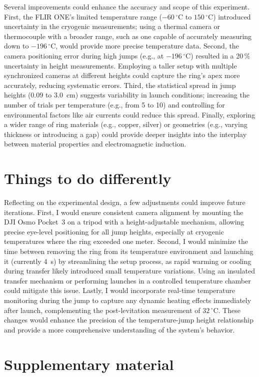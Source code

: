 \documentclass[11pt]{article}
\newcommand{\tC}[1]{$#1\,^{\circ}\mathrm{C}$}
\begin{document}
Several improvements could enhance the accuracy and scope of this experiment. First, the FLIR ONE's
limited temperature range (\tC{-60} to \tC{150}) introduced uncertainty in the cryogenic
measurements; using a thermal camera or thermocouple with a broader range, such as one capable of
accurately measuring down to \tC{-196}, would provide more precise temperature data. Second, the
camera positioning error during high jumps (e.g., at \tC{-196}) resulted in a 20\,\% uncertainty in
height measurements. Employing a taller setup with multiple synchronized cameras at
different heights could capture the ring's apex more accurately, reducing systematic errors. Third,
the statistical spread in jump heights (0.09 to 3.0~cm) suggests variability in launch conditions;
increasing the number of trials per temperature (e.g., from 5 to 10) and controlling for
environmental factors like air currents could reduce this spread. Finally, exploring a wider range of ring
materials (e.g., copper, silver) or geometries (e.g., varying thickness or introducing a gap) could
provide deeper insights into the interplay between material properties and electromagnetic
induction.

\section*{Things to do differently}

Reflecting on the experimental design, a few adjustments could improve future iterations. First, I
would ensure consistent camera alignment by mounting the DJI Osmo Pocket~3 on a tripod with a
height-adjustable mechanism, allowing precise eye-level positioning for all jump heights,
especially at cryogenic temperatures where the ring exceeded one meter. Second, I would minimize
the time between removing the ring from its temperature environment and launching it (currently
4~s) by streamlining the setup process, as rapid warming or cooling during transfer likely
introduced small temperature variations. Using an insulated transfer mechanism or performing
launches in a controlled temperature chamber could mitigate this issue. Lastly, I would incorporate
real-time temperature monitoring during the jump to capture any dynamic heating effects immediately
after launch, complementing the post-levitation measurement of \tC{32}. These changes would enhance
the precision of the temperature-jump height relationship and provide a more comprehensive
understanding of the system's behavior.

\section*{Supplementary material}
\end{document}
